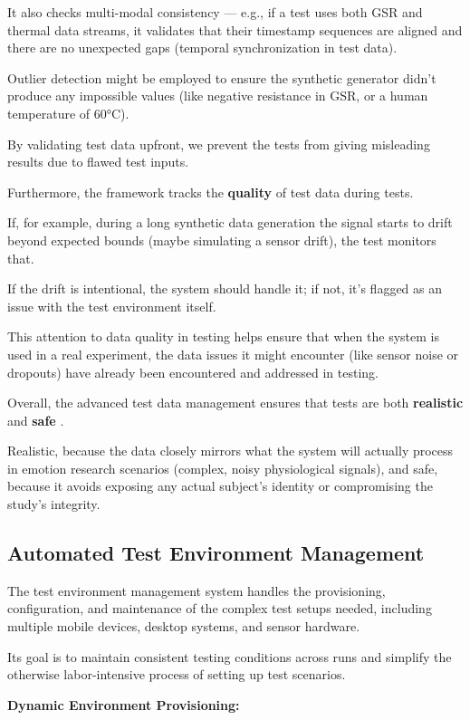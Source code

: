 {{{It also checks multi-modal consistency --- e.g., if a test uses both GSR and thermal data streams, it validates that their timestamp sequences are aligned and there are no unexpected gaps (temporal synchronization in test data).

Outlier detection might be employed to ensure the synthetic generator didn't produce any impossible values (like negative resistance in GSR, or a human temperature of 60°C).

By validating test data upfront, we prevent the tests from giving misleading results due to flawed test inputs.

Furthermore, the framework tracks the \textbf{quality}
 of test data during tests.

If, for example, during a long synthetic data generation the signal starts to drift beyond expected bounds (maybe simulating a sensor drift), the test monitors that.

If the drift is intentional, the system should handle it; if not, it's flagged as an issue with the test environment itself.

This attention to data quality in testing helps ensure that when the system is used in a real experiment, the data issues it might encounter (like sensor noise or dropouts) have already been encountered and addressed in testing.

Overall, the advanced test data management ensures that tests are both \textbf{realistic}
 and \textbf{safe}
.

Realistic, because the data closely mirrors what the system will actually process in emotion research scenarios (complex, noisy physiological signals), and safe, because it avoids exposing any actual subject's identity or compromising the study's integrity.

\subsection{Automated Test Environment Management}

The test environment management system handles the provisioning, configuration, and maintenance of the complex test setups needed, including multiple mobile devices, desktop systems, and sensor hardware.

Its goal is to maintain consistent testing conditions across runs and simplify the otherwise labor-intensive process of setting up test scenarios.

\textbf{Dynamic Environment Provisioning:}

}}}
